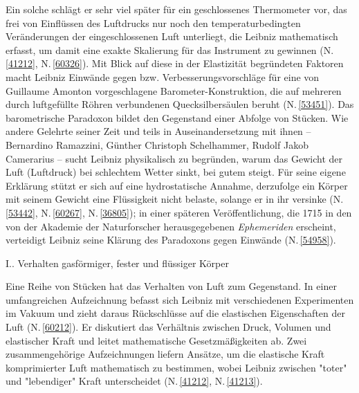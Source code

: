 Ein solche schlägt er sehr viel später für ein geschlossenes Thermometer vor, das frei von Einflüssen des Luftdrucks nur noch den  
temperaturbedingten Veränderungen der eingeschlossenen Luft unterliegt, die Leibniz mathematisch erfasst, um damit eine exakte Skalierung für das Instrument zu gewinnen (N.\,\ref{41212}, N.\,\ref{60326}). Mit Blick auf diese in der Elastizität begründeten Faktoren macht Leibniz Einwände gegen bzw. Verbesserungsvorschläge für eine von Guillaume Amonton vorgeschlagene Barometer-Konstruktion, die auf mehreren durch luftgefüllte Röhren verbundenen Quecksilbersäulen beruht (N.\,\ref{53451}).
Das barometrische Paradoxon bildet den Gegenstand einer Abfolge von Stücken. Wie andere Gelehrte seiner Zeit und teils in Auseinandersetzung mit ihnen -- Bernardino Ramazzini, Günther Christoph Schelhammer, Rudolf Jakob Camerarius -- sucht Leibniz physikalisch zu begründen, warum das Gewicht der Luft (Luftdruck) bei schlechtem Wetter sinkt, bei gutem steigt. Für seine eigene Erklärung stützt er sich auf eine hydrostatische Annahme, derzufolge ein Körper mit seinem Gewicht eine Flüssigkeit nicht belaste, solange er in ihr versinke (N.\,\ref{53442}, N.\,\ref{60267}, N.\,\ref{36805}); in einer späteren Veröffentlichung, die 1715 in den von der Akademie der Naturforscher herausgegebenen \textit{Ephemeriden} erscheint, verteidigt Leibniz seine Klärung des Paradoxons gegen Einwände (N.\,\ref{54958}).%
\par 
\vspace{1em}
\noindent
I.. Verhalten gasförmiger, fester und flüssiger Körper%
\par
\noindent
Eine Reihe von Stücken hat das Verhalten von Luft zum Gegenstand. In einer umfangreichen Aufzeichnung befasst sich Leibniz mit verschiedenen Experimenten im Vakuum und zieht daraus Rückschlüsse auf die elastischen Eigenschaften der Luft (N.\,\ref{60212}). Er diskutiert das Verhältnis zwischen Druck, Volumen und elastischer Kraft und leitet mathematische Gesetzmäßigkeiten ab. Zwei zusammengehörige Aufzeichnungen liefern Ansätze, um die elastische Kraft komprimierter Luft mathematisch zu bestimmen, wobei Leibniz zwischen "toter" und "lebendiger" Kraft unterscheidet (N.\,\ref{41212}, N.\,\ref{41213}).%
\par
